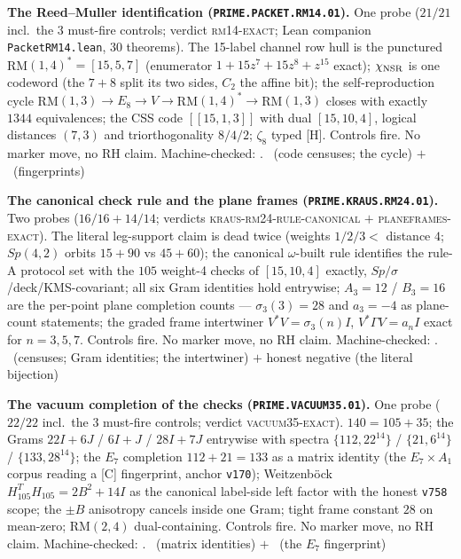 \par\smallskip\noindent\textbf{The Reed--Muller identification
(\texttt{PRIME.PACKET.RM14.01}).}
One probe ($21/21$ incl.\ the $3$ must-fire controls; verdict
\textsc{rm14-exact}; Lean companion \texttt{PacketRM14.lean}, $30$
theorems).  The 15-label channel row hull is the punctured
RM$(1,4)^*=[15,5,7]$ (enumerator $1+15z^7+15z^8+z^{15}$ exact);
$\chi_{\rm NSR}$ is one codeword (the $7{+}8$ split its two sides,
$C_2$ the affine bit); the self-reproduction cycle
RM$(1,3)\to E_8\to V\to$RM$(1,4)^*\to$RM$(1,3)$ closes with
exactly $1344$ equivalences; the CSS code $[[15,1,3]]$ with dual
$[15,10,4]$, logical distances $(7,3)$ and triorthogonality
$8/4/2$; $\zeta_8$ typed [H].  Controls fire.  No marker move, no
RH claim.
Machine-checked: .
\mE\ (code censuses; the cycle) $+$ \mC\ (fingerprints)
\par\smallskip


\par\smallskip\noindent\textbf{The canonical check rule and the
plane frames (\texttt{PRIME.KRAUS.RM24.01}).}
Two probes ($16/16+14/14$; verdicts
\textsc{kraus-rm24-rule-canonical} $+$ \textsc{planeframes-exact}).
The literal leg-support claim is dead twice (weights $1/2/3<$
distance $4$; $Sp(4,2)$ orbits $15{+}90$ vs $45{+}60$); the
canonical $\omega$-built rule identifies the rule-A protocol set
with the $105$ weight-4 checks of $[15,10,4]$ exactly,
$Sp/\sigma$/deck/KMS-covariant; all six Gram identities hold
entrywise; $A_3=12$ / $B_3=16$ are the per-point plane completion
counts --- $\sigma_3(3)=28$ and $a_3=-4$ as plane-count
statements; the graded frame intertwiner $V^*V=\sigma_3(n)I$,
$V^*\Gamma V=a_nI$ exact for $n=3,5,7$.  Controls fire.  No
marker move, no RH claim.
Machine-checked: .
\mE\ (censuses; Gram identities; the intertwiner) $+$ honest
negative (the literal bijection)
\par\smallskip


\par\smallskip\noindent\textbf{The vacuum completion of the checks
(\texttt{PRIME.VACUUM35.01}).}
One probe ($22/22$ incl.\ the $3$ must-fire controls; verdict
\textsc{vacuum35-exact}).  $140=105+35$; the Grams $22I+6J$ /
$6I+J$ / $28I+7J$ entrywise with spectra $\{112,22^{14}\}$ /
$\{21,6^{14}\}$ / $\{133,28^{14}\}$; the $E_7$ completion
$112+21=133$ as a matrix identity (the $E_7\times A_1$ corpus
reading a [C] fingerprint, anchor \texttt{v170}); Weitzenb\"ock
$H_{105}^TH_{105}=2B^2+14I$ as the canonical label-side left
factor with the honest \texttt{v758} scope; the $\pm B$
anisotropy cancels inside one Gram; tight frame constant $28$ on
mean-zero; RM$(2,4)$ dual-containing.  Controls fire.  No marker
move, no RH claim.
Machine-checked: .
\mE\ (matrix identities) $+$ \mC\ (the $E_7$ fingerprint)
\par\smallskip


